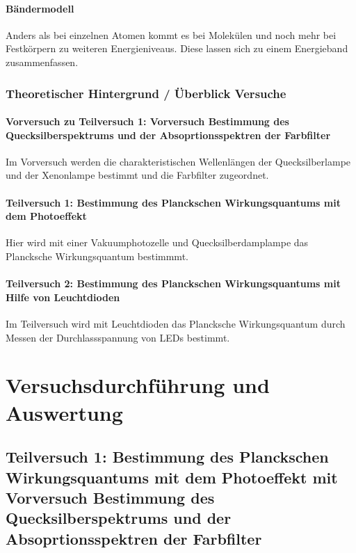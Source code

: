 \documentclass[12pt,oneside,oldfontcommands]{memoir}
\begin{document}
\paragraph{Bändermodell}
Anders als bei einzelnen Atomen kommt es bei Molekülen und noch mehr bei Festkörpern zu weiteren Energieniveaus. Diese lassen sich zu einem Energieband zusammenfassen.

\subsubsection{Theoretischer Hintergrund / Überblick Versuche}
\paragraph{Vorversuch zu Teilversuch 1: Vorversuch Bestimmung des Quecksilberspektrums und der Absoprtionsspektren der Farbfilter}
Im Vorversuch werden die charakteristischen Wellenlängen der Quecksilberlampe und der Xenonlampe bestimmt und die Farbfilter zugeordnet.
\paragraph{Teilversuch 1: Bestimmung des Planckschen Wirkungsquantums mit dem Photoeffekt}
Hier wird mit einer Vakuumphotozelle und Quecksilberdamplampe das Plancksche Wirkungsquantum bestimmmt.
\paragraph{Teilversuch 2: Bestimmung des Planckschen Wirkungsquantums mit Hilfe von Leuchtdioden}
Im Teilversuch wird mit Leuchtdioden das Plancksche Wirkungsquantum durch Messen der Durchlassspannung von LEDs bestimmt.
\section{Versuchsdurchführung und Auswertung}
\subsection{Teilversuch 1: Bestimmung des Planckschen Wirkungsquantums mit dem Photoeffekt mit Vorversuch Bestimmung des Quecksilberspektrums und der Absoprtionsspektren der Farbfilter}
\end{document}
